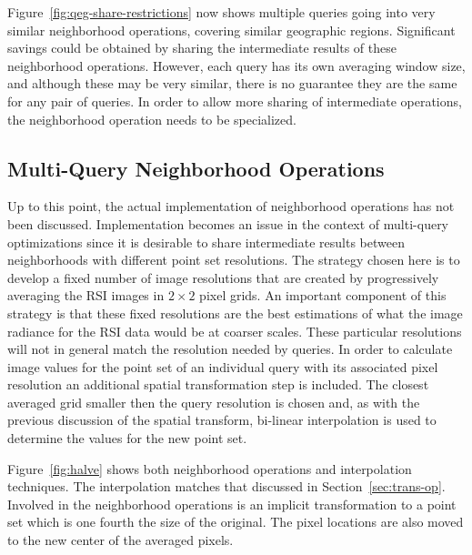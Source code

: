\documentclass{ucdthesis}       %
\begin{document}
Figure~\ref{fig:qeg-share-restrictions} now shows multiple queries
going into very similar neighborhood operations, covering similar
geographic regions.  Significant savings could be obtained by sharing the
intermediate results of these neighborhood operations.  However, each
query has its own averaging window size, and although these may be
very similar, there is no guarantee they are the same for any pair of
queries.  In order to allow more sharing of intermediate operations,
the neighborhood operation needs to be specialized.

\subsection{Multi-Query Neighborhood Operations}
\label{sec:nbr-multi}

Up to this point, the actual implementation of neighborhood operations
has not been discussed.  Implementation becomes an issue in the
context of multi-query optimizations since it is desirable to share
intermediate results between neighborhoods with different point set
resolutions.  The strategy chosen here is to develop a fixed number of
image resolutions that are created by progressively averaging the
\ac{RSI} images in $2 \times 2$ pixel grids.  An important component
of this strategy is that these fixed resolutions are the best
estimations of what the image radiance for the \ac{RSI} data would be
at coarser scales.  These particular resolutions will not in general
match the resolution needed by queries.  In order to calculate image
values for the point set of an individual query with its associated
pixel resolution an additional spatial transformation step is
included.  The closest averaged grid smaller then the query resolution
is chosen and, as with the previous discussion of the spatial
transform, bi-linear interpolation is used to determine the values for
the new point set.

Figure~\ref{fig:halve} shows both neighborhood operations and
interpolation techniques.  The interpolation matches that discussed
in Section~\ref{sec:trans-op}.  Involved in the neighborhood
operations is an implicit transformation to a point set which is one
fourth the size of the original.  The pixel locations are also moved
to the new center of the averaged pixels.
\end{document}
